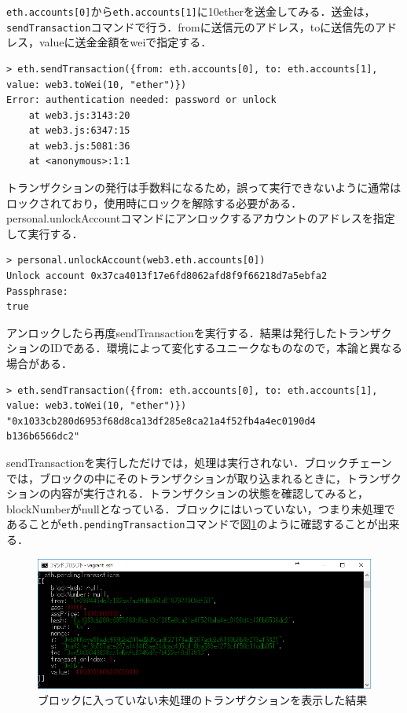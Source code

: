 \texttt{eth.accounts[0]}から\texttt{eth.accounts[1]}に10etherを送金してみる．送金は，\texttt{sendTransaction}コマンドで行う．fromに送信元のアドレス，toに送信先のアドレス，valueに送金金額をweiで指定する．
\begin{verbatim}
> eth.sendTransaction({from: eth.accounts[0], to: eth.accounts[1], 
value: web3.toWei(10, "ether")})
Error: authentication needed: password or unlock
    at web3.js:3143:20
    at web3.js:6347:15
    at web3.js:5081:36
    at <anonymous>:1:1
\end{verbatim}
トランザクションの発行は手数料になるため，誤って実行できないように通常はロックされており，使用時にロックを解除する必要がある．personal.unlockAccountコマンドにアンロックするアカウントのアドレスを指定して実行する．
\begin{verbatim}
> personal.unlockAccount(web3.eth.accounts[0])
Unlock account 0x37ca4013f17e6fd8062afd8f9f66218d7a5ebfa2
Passphrase:
true
\end{verbatim}
アンロックしたら再度sendTransactionを実行する．結果は発行したトランザクションのIDである．環境によって変化するユニークなものなので，本論と異なる場合がある．
\begin{verbatim}
> eth.sendTransaction({from: eth.accounts[0], to: eth.accounts[1], 
value: web3.toWei(10, "ether")})
"0x1033cb280d6953f68d8ca13df285e8ca21a4f52fb4a4ec0190d4
b136b6566dc2"
\end{verbatim}
\newpage
sendTransactionを実行しただけでは，処理は実行されない．ブロックチェーンでは，ブロックの中にそのトランザクションが取り込まれるときに，トランザクションの内容が実行される．トランザクションの状態を確認してみると，blockNumberがnullとなっている．ブロックにはいっていない，つまり未処理であることが\texttt{eth.pendingTransaction}コマンドで図\ref{pending}のように確認することが出来る．
\begin{figure}[htb]
\centering
\includegraphics[width=12cm]{images/pending.png}
\caption{ブロックに入っていない未処理のトランザクションを表示した結果}\label{pending}
\end{figure}

